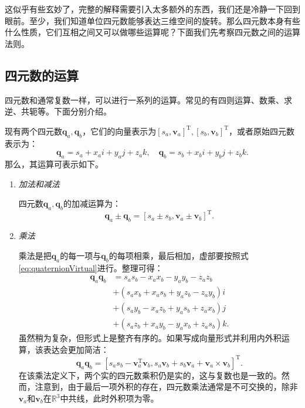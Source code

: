 这似乎有些玄妙了，完整的解释需要引入太多额外的东西，我们还是冷静一下回到眼前。至少，我们知道单位四元数能够表达三维空间的旋转。那么四元数本身有些什么性质，它们互相之间又可以做哪些运算呢？下面我们先考察四元数之间的运算法则。

\subsection{四元数的运算}
四元数和通常复数一样，可以进行一系列的运算。常见的有四则运算、数乘、求逆、共轭等。下面分别介绍。

现有两个四元数$\bm{q}_a, \bm{q}_b$，它们的向量表示为$[s_a, \bm{v}_a]^\mathrm{T}, [s_b, \bm{v}_b]^\mathrm{T}$，或者原始四元数表示为：
\[
\bm{q}_a = s_a+x_ai+y_aj+z_ak, \quad \bm{q}_b  = s_b+x_bi+y_bj+z_bk.
\]
那么，其运算可表示如下。

\begin{enumerate}
	\item {\emph{加法和减法}}
	
	四元数$\bm{q}_a, \bm{q}_b$的加减运算为：
	\begin{equation} 	
	\bm{q}_a \pm \bm{q}_b = \left[ s_a \pm s_b, \bm{v}_a \pm \bm{v}_b \right]^\mathrm{T}.
	\end{equation}
	\item{\emph{乘法}}
	
	乘法是把$\bm{q}_a$的每一项与$\bm{q}_b$的每项相乘，最后相加，虚部要按照式\eqref{eq:quaternionVirtual}进行。整理可得：
	\begin{equation}
	\begin{aligned}
	\bm{q}_a \bm{q}_b &= {s_a}{s_b} - {x_a}{x_b} - {y_a}{y_b} - {z_a}{z_b}\\
	&+ \left( {{s_a}{x_b} + {x_a}{s_b} + {y_a}{z_b} - {z_a}{y_b}} \right)i\\
	&+ \left( {{s_a}{y_b} - {x_a}{z_b} + {y_a}{s_b} + {z_a}{x_b}} \right)j\\
	&+ \left( {{s_a}{z_b} + {x_a}{y_b} - {y_a}{x_b} + {z_a}{s_b}} \right)k.
	\end{aligned}
	\end{equation}
	虽然稍为复杂，但形式上是整齐有序的。如果写成向量形式并利用内外积运算，该表达会更加简洁：
	\begin{equation}
	\bm{q}_a \bm{q}_b = \left[ s_a s_b - \bm{v}_a^\mathrm{T} \bm{v}_b, s_a\bm{v}_b + s_b\bm{v}_a + \bm{v}_a \times \bm{v}_b \right]^\mathrm{T}.
	\end{equation}
	在该乘法定义下，两个实的四元数乘积仍是实的，这与复数也是一致的。然而，注意到，由于最后一项外积的存在，四元数乘法通常是不可交换的，除非$\bm{v}_a$和$\bm{v}_b$在$\mathbb{R}^3$中共线，此时外积项为零。


\end{enumerate}
